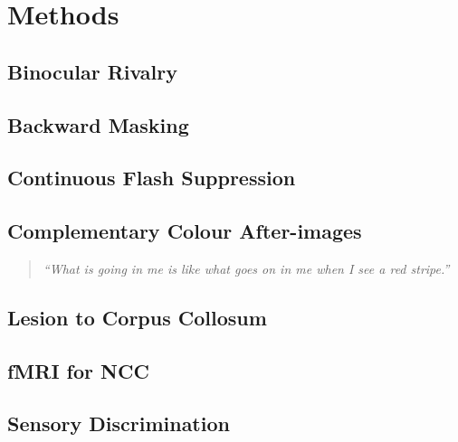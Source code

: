 \section{Methods}



\subsection{Binocular Rivalry}


\subsection{Backward Masking}


\subsection{Continuous Flash Suppression}



\subsection{Complementary Colour After-images}






%

\begin{quote}
	\textit{``What is going in me is like what goes on in me when I see a red stripe.''}
\end{quote}

\subsection{Lesion to Corpus Collosum}


\subsection{fMRI for NCC}


\subsection{Sensory Discrimination}

